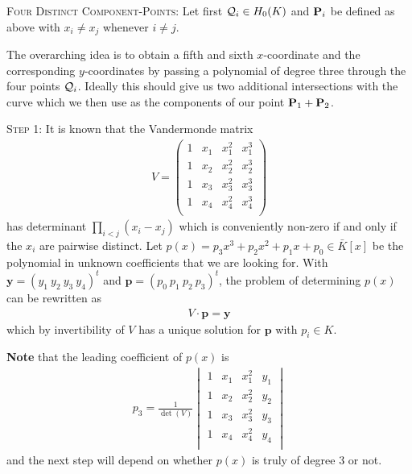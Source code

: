 \documentclass[english,11pt,a4paper]{article}
\begin{document}
\begin{case} {\scshape Four Distinct Component-Points:}
	Let first $\q_i \in \enk$ and $\P_i$ be defined as above with $x_i \neq x_j$ whenever $i \neq j$.

	The overarching idea is to obtain a fifth and sixth $x$-coordinate and the corresponding $y$-coordinates by passing a polynomial of degree three through the four points $\q_i$. Ideally this should give us two additional intersections with the curve which we then use as the components of our point $\P_1 + \P_2$.

	{\scshape Step 1:} It is known that the Vandermonde matrix
	\begin{align*}V=
		\begin{pmatrix}
			1 & x_1 & x_1^2 & x_1^3\\
			1 & x_2 & x_2^2 & x_2^3\\
			1 & x_3 & x_3^2 & x_3^3\\
			1 & x_4 & x_4^2 & x_4^3\\
		\end{pmatrix}
	\end{align*}
	has determinant $\prod_{i < j} (x_i-x_j)$ which is conveniently non-zero if and only if the $x_i$ are pairwise distinct. Let $p(x) = p_3 x^3 + p_2 x^2 + p_1 x + p_0 \in \bar K[x]$ be the polynomial in unknown coefficients that we are looking for. With $\textbf{y} = (y_1 \ y_2 \ y_3 \ y_4)^t$ and $\textbf{p} = (p_0 \ p_1 \ p_2 \ p_3)^t$, the problem of determining $p(x)$ can be rewritten as
	\begin{align*}
		V \cdot \mathbf{p} = \mathbf{y}
	\end{align*}
	which by invertibility of $V$ has a unique solution for $\mathbf{p}$ with $p_i\in K$.

	\textbf{Note} that the leading coefficient of $p(x)$ is
	\begin{align*}
	  p_3 = \frac{1}{\det (V)}
	  \begin{vmatrix}
			1 & x_1 & x_1^2 & y_1\\
			1 & x_2 & x_2^2 & y_2\\
			1 & x_3 & x_3^2 & y_3\\
			1 & x_4 & x_4^2 & y_4\\	  
	  \end{vmatrix}
	\end{align*}
	and the next step will depend on whether $p(x)$ is truly of degree 3 or not.


\end{case}
\end{document}
